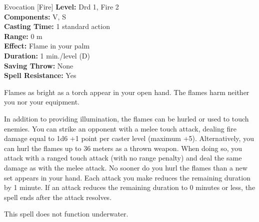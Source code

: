 {Evocation [Fire]}
{
	\textbf{Level:}
	Drd 1, Fire 2\\
	\textbf{Components:}
	V, S\\
	\textbf{Casting Time:}
	1 standard action\\
	\textbf{Range:}
	0 m\\
	\textbf{Effect:}
	Flame in your palm\\
	\textbf{Duration:}
	1 min./level (D)\\
	\textbf{Saving Throw:}
	None\\
	\textbf{Spell Resistance:}
	Yes\\
}
{
	Flames as bright as a torch appear in your open hand. The flames harm neither you nor your equipment.

	In addition to providing illumination, the flames can be hurled or used to touch enemies. You can strike an opponent with a melee touch attack, dealing fire damage equal to 1d6 +1 point per caster level (maximum +5). Alternatively, you can hurl the flames up to 36 meters as a thrown weapon. When doing so, you attack with a ranged touch attack (with no range penalty) and deal the same damage as with the melee attack. No sooner do you hurl the flames than a new set appears in your hand. Each attack you make reduces the remaining duration by 1 minute. If an attack reduces the remaining duration to 0 minutes or less, the spell ends after the attack resolves.

	This spell does not function underwater.

}
